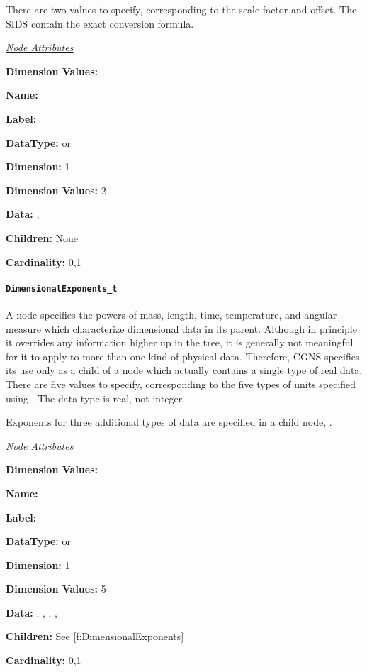 There are two values to specify, corresponding to the scale factor and
offset. The SIDS contain the exact conversion formula.

\textit{\uline{Node Attributes}}
\begin{Ventryic}{\textbf{Dimension Values:}}
\item [\textbf{Name:}]
\item [\textbf{Label:}]
\item [\textbf{DataType:}]
       or 
\item [\textbf{Dimension:}]
      1
\item [\textbf{Dimension Values:}]
      2
\item [\textbf{Data:}]
      , 
\item [\textbf{Children:}]
      None
\item [\textbf{Cardinality:}]
      0,1
\end{Ventryic}

\paragraph{\texttt{DimensionalExponents\_t}}

A  node specifies the powers of mass,
length, time, temperature, and angular measure which characterize
dimensional data in its parent. Although in principle it overrides any
 information higher up in the tree, it
is generally not meaningful for it to apply to more than one kind of
physical data. Therefore, CGNS specifies its use only as a child of
a node which actually contains a single type of real data.
There are five values to specify, corresponding to the five types of
units specified using .
The data type is real, not integer.

Exponents for three additional types of data are specified in a child
node, .

\textit{\uline{Node Attributes}}
\begin{Ventryic}{\textbf{Dimension Values:}}
\raggedright
\item [\textbf{Name:}]
\item [\textbf{Label:}]
\item [\textbf{DataType:}]
       or 
\item [\textbf{Dimension:}]
      1
\item [\textbf{Dimension Values:}]
      5
\item [\textbf{Data:}]
      , , ,
      , 
\item [\textbf{Children:}]
      See \autoref{f:DimensionalExponents}
\item [\textbf{Cardinality:}]
      0,1
\end{Ventryic}

